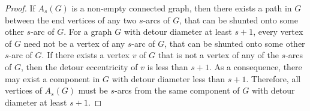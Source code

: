 \documentclass[10pt,a4paper]{amsart}
\begin{document}
\begin{proof}
	
	If $A_{s}(G)$ is a non-empty connected graph, then there exists a path in $G$ between the end vertices of any two $s$-arcs of $G$, that can be shunted onto some other $s$-arc of $G$. For a graph $G$ with detour diameter at least $s+1$, every vertex of $G$ need not be a vertex of any $s$-arc of $G$, that can be shunted onto some other $s$-arc of $G$. If there exists a vertex $v$ of $G$ that is not a vertex of any of the $s$-arcs of $G$, then the detour eccentricity of $v$ is less than $s+1$. As a consequence, there may exist a component in $G$ with detour diameter less than $s+1$. %
	Therefore, all vertices of $A_{s}(G)$ must be $s$-arcs from the same component of $G$ with detour diameter at least $s+1$.
\end{proof}
\end{document}
